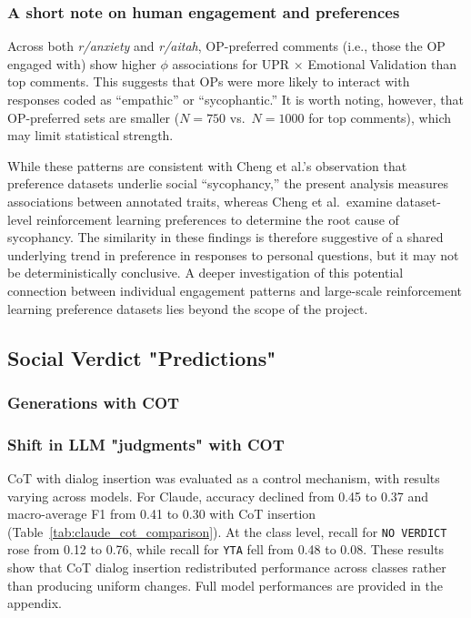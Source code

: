 \subsubsection{A short note on human engagement and preferences}

Across both \textit{r/anxiety} and \textit{r/aitah}, OP-preferred comments (i.e., those the OP engaged with) show higher $\phi$ associations for UPR $\times$ Emotional Validation than top comments. This suggests that OPs were more likely to interact with responses coded as ``empathic'' or ``sycophantic.'' It is worth noting, however, that OP-preferred sets are smaller ($N = 750$ vs.\ $N = 1000$ for top comments), which may limit statistical strength. 

While these patterns are consistent with Cheng et al.'s observation that preference datasets underlie social ``sycophancy,'' the present analysis measures associations between annotated traits, whereas Cheng et al.\ examine dataset-level reinforcement learning preferences to determine the root cause of sycophancy\cite{cheng-etal-sycophancy}. The similarity in these findings is therefore suggestive of a shared underlying trend in preference in responses to personal questions, but it may not be deterministically conclusive. A deeper investigation of this potential connection between individual engagement patterns and large-scale reinforcement learning preference datasets lies beyond the scope of the project.

\subsection{Social Verdict "Predictions"}

\subsubsection{Generations with COT}

\subsubsection{Shift in LLM "judgments" with COT}\label{sec:posterchild2.2}

CoT with dialog insertion was evaluated as a control mechanism, with results varying across models. For Claude, accuracy declined from 0.45 to 0.37 and macro-average F1 from 0.41 to 0.30 with CoT insertion (Table~\ref{tab:claude_cot_comparison}). At the class level, recall for \texttt{NO VERDICT} rose from 0.12 to 0.76, while recall for \texttt{YTA} fell from 0.48 to 0.08. These results show that CoT dialog insertion redistributed performance across classes rather than producing uniform changes. Full model performances are provided in the appendix.



